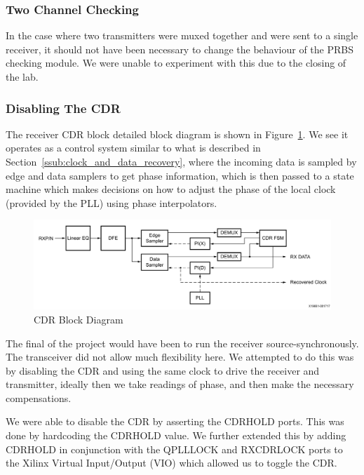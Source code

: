 \subsubsection{Two Channel Checking}%
\label{ssub:two_channel_checking}
In the case where two transmitters were muxed together and were sent to a
single receiver, it should not have been necessary to change the behaviour of
the PRBS checking module.
We were unable to experiment with this due to the closing of the lab.

\subsubsection{Disabling The CDR}%
\label{ssub:disabling_the_cdr}
The receiver CDR block detailed block diagram is shown in
Figure~\ref{fig:cdr_detail}. We see it operates as a control system similar to
what is described in Section~\ref{ssub:clock_and_data_recovery}, where the
incoming data is sampled by edge and data samplers to get phase information,
which is then passed to a state machine which makes decisions on how to adjust
the phase of the local clock (provided by the PLL) using phase interpolators.

\begin{figure}[ht]
    \centering
    \hspace*{-1cm}\includegraphics[width=1.2\linewidth]{img/cdr_detail}
    \caption{CDR Block Diagram}%
    \label{fig:cdr_detail}
\end{figure}

The final of the project would have been to run the receiver source-synchronously.  The
transceiver did not allow much flexibility here. We attempted to do this was by
disabling the CDR and using the same clock to drive the receiver and
transmitter, ideally then we take readings of phase, and then make the
necessary compensations.
 
We were able to disable the CDR by asserting the CDRHOLD ports. This was done
by hardcoding the CDRHOLD value. We further extended this by adding CDRHOLD
in conjunction with the QPLLLOCK and RXCDRLOCK ports to the Xilinx Virtual
Input/Output (VIO) which allowed us to toggle the CDR.

